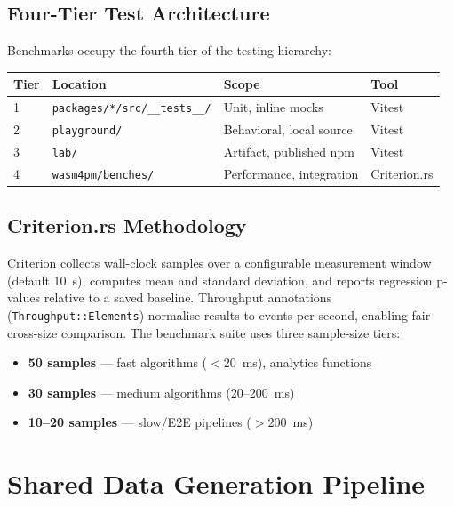 \documentclass[11pt,a4paper]{article}
\begin{document}
\subsection{Four-Tier Test Architecture}

Benchmarks occupy the fourth tier of the testing hierarchy:

\begin{center}
\begin{tabular}{@{}llll@{}}
\toprule
\textbf{Tier} & \textbf{Location} & \textbf{Scope} & \textbf{Tool} \\
\midrule
1 & \texttt{packages/*/src/\_\_tests\_\_/} & Unit, inline mocks & Vitest \\
2 & \texttt{playground/} & Behavioral, local source & Vitest \\
3 & \texttt{lab/} & Artifact, published npm & Vitest \\
4 & \texttt{wasm4pm/benches/} & Performance, integration & Criterion.rs \\
\bottomrule
\end{tabular}
\end{center}

\subsection{Criterion.rs Methodology}

Criterion collects wall-clock samples over a configurable measurement
window (default 10~s), computes mean and standard deviation, and reports
regression p-values relative to a saved baseline. Throughput annotations
(\texttt{Throughput::Elements}) normalise results to events-per-second,
enabling fair cross-size comparison. The benchmark suite uses three
sample-size tiers:

\begin{itemize}
  \item \textbf{50 samples} — fast algorithms ($<$20~ms), analytics functions
  \item \textbf{30 samples} — medium algorithms (20--200~ms)
  \item \textbf{10--20 samples} — slow/E2E pipelines ($>$200~ms)
\end{itemize}

\section{Shared Data Generation Pipeline}
\label{sec:datagen}
\end{document}
